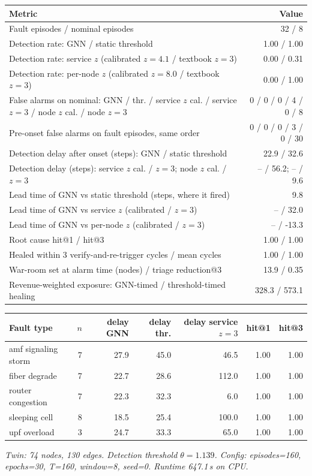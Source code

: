 \begin{center}\small\begin{tabular}{@{}p{9.2cm}r@{}}\toprule Metric & Value \\ \midrule
Fault episodes / nominal episodes & 32 / 8 \\
Detection rate: GNN / static threshold & 1.00 / 1.00 \\
Detection rate: service $z$ (calibrated $z=4.1$ / textbook $z=3$) & 0.00 / 0.31 \\
Detection rate: per-node $z$ (calibrated $z=8.0$ / textbook $z=3$) & 0.00 / 1.00 \\
False alarms on nominal: GNN / thr. / service $z$ cal. / service $z{=}3$ / node $z$ cal. / node $z{=}3$ & 0 / 0 / 0 / 4 / 0 / 8 \\
Pre-onset false alarms on fault episodes, same order & 0 / 0 / 0 / 3 / 0 / 30 \\
Detection delay after onset (steps): GNN / static threshold & 22.9 / 32.6 \\
Detection delay (steps): service $z$ cal. / $z{=}3$; node $z$ cal. / $z{=}3$ & -- / 56.2; -- / 9.6 \\
Lead time of GNN vs static threshold (steps, where it fired) & 9.8 \\
Lead time of GNN vs service $z$ (calibrated / $z{=}3$) & -- / 32.0 \\
Lead time of GNN vs per-node $z$ (calibrated / $z{=}3$) & -- / -13.3 \\
Root cause hit@1 / hit@3 & 1.00 / 1.00 \\
Healed within 3 verify-and-re-trigger cycles / mean cycles & 1.00 / 1.00 \\
War-room set at alarm time (nodes) / triage reduction@3 & 13.9 / 0.35 \\
Revenue-weighted exposure: GNN-timed / threshold-timed healing & 328.3 / 573.1 \\
\bottomrule\end{tabular}\end{center}

\begin{center}\small\begin{tabular}{@{}lrrrrrr@{}}\toprule
Fault type & $n$ & delay GNN & delay thr. & delay service $z{=}3$ & hit@1 & hit@3 \\ \midrule
amf signaling storm & 7 & 27.9 & 45.0 & 46.5 & 1.00 & 1.00 \\
fiber degrade & 7 & 22.7 & 28.6 & 112.0 & 1.00 & 1.00 \\
router congestion & 7 & 22.3 & 32.3 & 6.0 & 1.00 & 1.00 \\
sleeping cell & 8 & 18.5 & 25.4 & 100.0 & 1.00 & 1.00 \\
upf overload & 3 & 24.7 & 33.3 & 65.0 & 1.00 & 1.00 \\
\bottomrule\end{tabular}\end{center}
\noindent\textit{Twin: 74 nodes, 130 edges. Detection threshold $\theta=1.139$. Config: episodes=160, epochs=30, T=160, window=8, seed=0. Runtime 647.1\,s on CPU.}
